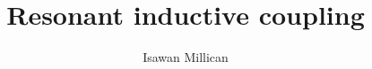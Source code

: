 \documentclass{tufte-handout}
\begin{document}
\title{Resonant inductive coupling}
\author{Isawan Millican}
\maketitle



\end{document}
